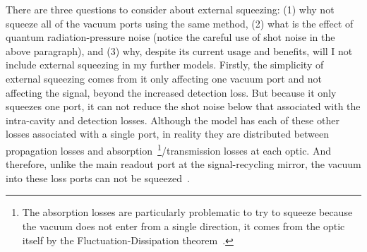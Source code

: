 There are three questions to consider about external squeezing: (1) why not squeeze all of the vacuum ports using the same method, (2) what is the effect of quantum radiation-pressure noise (notice the careful use of shot noise in the above paragraph), and (3) why, despite its current usage and benefits, will I not include external squeezing in my further models. 
Firstly, the simplicity of external squeezing comes from it only affecting one vacuum port and not affecting the signal, beyond the increased detection loss. But because it only squeezes one port, it can not reduce the shot noise below that associated with the intra-cavity and detection losses. Although the model has each of these other losses associated with a single port, in reality they are distributed between propagation losses and absorption~\footnote{The absorption losses are particularly problematic to try to squeeze because the vacuum does not enter from a single direction, it comes from the optic itself by the Fluctuation-Dissipation theorem~\cite{}.}/transmission  losses at each optic. And therefore, unlike the main readout port at the signal-recycling mirror, the vacuum into these loss ports can not be squeezed~\cite{}. 
